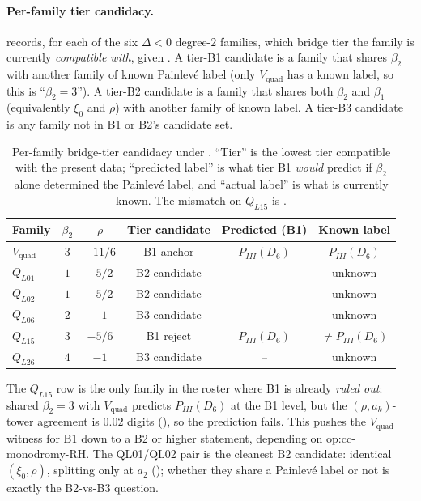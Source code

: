\documentclass[11pt,reqno]{amsart}
\theoremstyle{plain}
\theoremstyle{definition}
\theoremstyle{remark}
\newcommand{\Vquad}{V_{\mathrm{quad}}}
\begin{document}
\paragraph{Per-family tier candidacy.}
 records, for each of the six
$\Delta < 0$ degree-$2$ families, which bridge tier the
family is currently \emph{compatible with}, given
. A tier-B1 candidate is a family
that shares $\beta_2$ with another family of known Painlev\'e
label (only $\Vquad$ has a known label, so this is
``$\beta_2 = 3$''). A tier-B2 candidate is a family that
shares both $\beta_2$ and $\beta_1$ (equivalently $\xi_0$ and
$\rho$) with another family of known label. A tier-B3
candidate is any family not in B1 or B2's candidate set.

\begin{table}[ht]
\centering
\small
\caption{Per-family bridge-tier candidacy under
. ``Tier'' is the lowest tier compatible
with the present data; ``predicted label'' is what tier B1
\emph{would} predict if $\beta_2$ alone determined the
Painlev\'e label, and ``actual label''
is what is currently known. The mismatch on $Q_{L15}$ is
.}
\label{tab:bridge-tier}
\begin{tabular}{l c c c c c}
\toprule
Family & $\beta_2$ & $\rho$ & Tier candidate &
  Predicted (B1) & Known label \\
\midrule
$\Vquad$  & $3$ & $-11/6$ & B1 anchor   & $P_{III}(D_6)$ &
   $P_{III}(D_6)$ \\
$Q_{L01}$ & $1$ & $-5/2$  & B2 candidate & --              & unknown \\
$Q_{L02}$ & $1$ & $-5/2$  & B2 candidate & --              & unknown \\
$Q_{L06}$ & $2$ & $-1$    & B3 candidate & --              & unknown \\
$Q_{L15}$ & $3$ & $-5/6$  & B1 reject    & $P_{III}(D_6)$ &
   $\ne P_{III}(D_6)$ \\
$Q_{L26}$ & $4$ & $-1$    & B3 candidate & --              & unknown \\
\bottomrule
\end{tabular}
\end{table}

The $Q_{L15}$ row is the only family in the roster where B1
is already \emph{ruled out}: shared $\beta_2 = 3$ with
$\Vquad$ predicts $P_{III}(D_6)$ at the B1 level, but the
$(\rho, a_k)$-tower agreement is $0.02$ digits
(), so the prediction fails. This
pushes the $\Vquad$ witness for B1 down to a B2 or higher
statement, depending on \textsf{op:cc-monodromy-RH}. The
QL01/QL02 pair is the cleanest B2 candidate: identical
$(\xi_0, \rho)$, splitting only at $a_2$
(); whether they share a Painlev\'e label
or not is exactly the B2-vs-B3 question.
\end{document}
